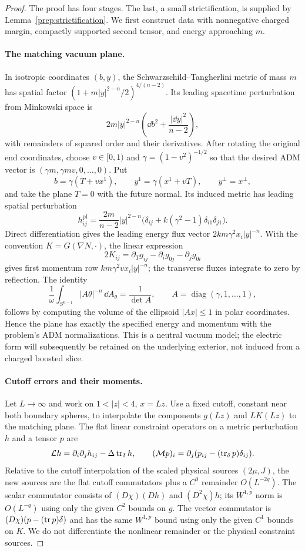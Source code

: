 \begin{proof}
The proof has four stages.  The last, a small strictification, is supplied
by Lemma~\ref{prep:strictification}.  We first construct data with
nonnegative charged margin, compactly supported second tensor, and
energy approaching $m$.

\paragraph{The matching vacuum plane.}
In isotropic coordinates $(b,y)$, the Schwarzschild--Tangherlini metric
of mass $m$ has spatial factor
$(1+m|y|^{2-n}/2)^{4/(n-2)}$.  Its leading spacetime perturbation from
Minkowski space is
\[
 2m|y|^{2-n}\left(\dd b^2+\frac{|\dd y|^2}{n-2}\right),
\]
with remainders of squared order and their derivatives.  After rotating
the original end coordinates, choose $v\in[0,1)$ and
$\gamma=(1-v^2)^{-1/2}$ so that the desired ADM vector is
$(\gamma m,\gamma mv,0,\ldots,0)$.  Put
\[
 b=\gamma(T+vx^1),\qquad y^1=\gamma(x^1+vT),\qquad
 y^\perp=x^\perp,
\]
and take the plane $T=0$ with the future normal.  Its induced metric has
leading spatial perturbation
\[
 h^{\mathrm{pl}}_{ij}
 =\frac{2m}{n-2}|y|^{2-n}
   \bigl(\delta_{ij}+k(\gamma^2-1)\delta_{i1}\delta_{j1}\bigr).
\]
Direct differentiation gives the leading energy flux vector
$2km\gamma^2x_i|y|^{-n}$.  With the convention
$K=G(\nabla N,\cdot)$, the linear expression
\[
 2K_{ij}=\partial_Tg_{ij}-\partial_i g_{0j}-\partial_jg_{0i}
\]
gives first momentum row $km\gamma^2v x_i|y|^{-n}$; the transverse
fluxes integrate to zero by reflection.  The identity
\[
 \frac1\omega\int_{S^{n-1}}|A\theta|^{-n}\,\dd A_\theta
 =\frac1{\det A},\qquad A=\operatorname{diag}(\gamma,1,\ldots,1),
\]
follows by computing the volume of the ellipsoid $|Ax|\leq1$ in polar
coordinates.  Hence the plane has exactly the specified energy and
momentum with the problem's ADM normalizations.  This is a neutral
vacuum model; the electric form will subsequently be retained on the
underlying exterior, not induced from a charged boosted slice.

\paragraph{Cutoff errors and their moments.}
Let $L\to\infty$ and work on $1<|z|<4$, $x=Lz$.  Use a fixed cutoff,
constant near both boundary spheres, to interpolate the components
$g(Lz)$ and $LK(Lz)$ to the matching plane.  The flat linear constraint
operators on a metric perturbation $h$ and a tensor $p$ are
\[
 \mathcal L h=\partial_i\partial_jh_{ij}-\Delta\operatorname{tr}_\delta h,
 \qquad (\mathcal Mp)_i=\partial_j(p_{ij}-(\operatorname{tr}_\delta p)\delta_{ij}).
\]
Relative to the cutoff interpolation of the scaled physical sources
$(2\mu,J)$, the new sources are the flat cutoff commutators plus a
$C^0$ remainder $O(L^{-2q})$.  The scalar commutator consists of
$(D\chi)(Dh)$ and $(D^2\chi)h$; its $W^{1,p}$ norm is
$O(L^{-q})$ using only the given $C^2$ bounds on $g$.
The vector commutator is $(D\chi)(p-(\operatorname{tr} p)\delta)$ and has the same
$W^{1,p}$ bound using only the given $C^1$ bounds on $K$.  We do not
differentiate the nonlinear remainder or the physical constraint
sources.


\end{proof}
